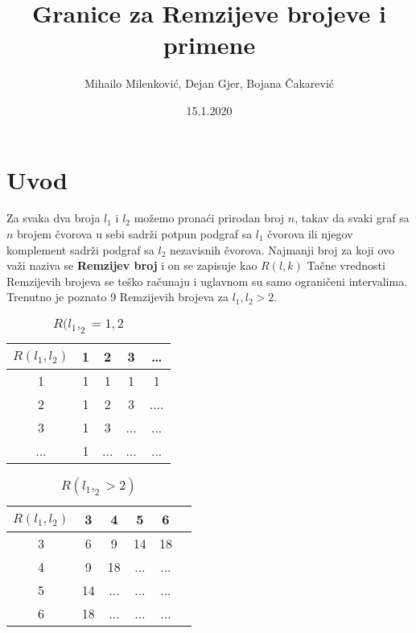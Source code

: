 \documentclass{article}
\title{Granice za Remzijeve brojeve i primene}
\date{15.1.2020}
\author{Mihailo Milenković, Dejan Gjer, Bojana Čakarević}
\theoremstyle{definition}
\begin{document}
		\maketitle

		\newpage

		\tableofcontents

		\newpage

		\section{Uvod}

		
		Za svaka dva broja $l_1$ i $l_2$ možemo pronaći prirodan broj $n$, takav da svaki graf sa $n$ brojem čvorova u sebi sadrži potpun podgraf sa $l_1$ čvorova ili njegov komplement sadrži podgraf sa $l_2$ nezavisnih čvorova.
	\newline
	Najmanji broj za koji ovo važi naziva se \textbf{Remzijev broj} i on se zapisuje kao $R(l,k)$ 
	\newline
	Tačne vrednosti Remzijevih brojeva se teško računaju i uglavnom su samo ograničeni intervalima. Trenutno je poznato 9 Remzijevih brojeva za $l_1,l_2>2$.
	\newline
	\begin{table}[h]
	    \centering
	    \begin{tabular}{|c|c|c|c|c|}
	    \hline
	    $R(l_1,l_2)$   &  1 & 2 & 3 & \ldots \\
	    \hline
	       1  & 1 & 1 & 1 &  1 \\
	       \hline
	       2 & 1 & 2 & 3 & ....\\
	       \hline
	       3 & 1 & 3 & ... & ... \\
	       \hline
	       ... & 1 & ... & ... & ... \\
	       \hline
	    \end{tabular}
	    \caption{$R(l_1,_2=1,2$}
	\end{table}
	
	\begin{table}[h]
	    \centering
	    \begin{tabular}{|c|c|c|c|c|c|}
	    \hline
	    $R(l_1,l_2)$    &  3 & 4 & 5 & 6 \\
	    \hline
	       3  & 6 & 9 & 14 &  18 \\
	       \hline
	       4 & 9 & 18 & ... & ...\\
	       \hline
	       5 & 14 & ... & ... & ... \\
	       \hline
	       6 & 18 & ... & ... & ... \\
	       \hline
	    \end{tabular}
	    \caption{$R(l_1,_2>2)$}
	    \end{table}
	
\end{document}
